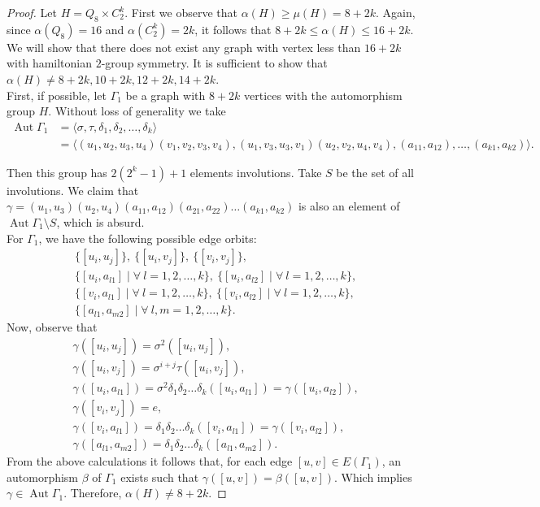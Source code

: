 \documentclass[12pt]{article}
\theoremstyle{plain}
\theoremstyle{definition}
\newcommand{\Aut}{\mathop{\mathrm{Aut}}}
\begin{document}
	\begin{proof}
		Let $H=Q_8\times C_2^k$. First we observe that $\alpha(H)\geq\mu(H)=8+2k$. Again, since $\alpha(Q_8)=16$ and $\alpha(C_2^k)=2k$, it follows that $8 + 2k \leq \alpha(H) \leq 16 + 2k$. We will show that there does not exist any graph with vertex less than $16+2k$ with hamiltonian $2$-group symmetry. It is sufficient to show that $\alpha(H)\neq 8+2k, 10+2k, 12+2k, 14+2k$.\\
		First, if possible, let $\Gamma_{1}$ be a graph with $8+2k$ vertices with the automorphism group $H$. Without loss of generality we take
		\begin{align*}
			\Aut \Gamma_{1} &= \langle \sigma, \tau, \delta_{1}, \delta_{2}, \ldots, \delta_{k} \rangle \\
			&= \langle (u_{1}, u_{2}, u_{3}, u_{4})(v_{1}, v_{2}, v_{3}, v_{4}), (u_{1}, v_{3}, u_{3}, v_{1})(u_{2}, v_{2}, u_{4}, v_{4}), (a_{11}, a_{12}), \ldots, (a_{k1}, a_{k2})\rangle .
		\end{align*}
		
		Then this group has $2(2^{k} -1)+1$ elements involutions. Take $S$ be the set of all involutions. We claim that $\gamma = (u_{1}, u_{3})(u_{2}, u_{4})(a_{11}, a_{12})(a_{21}, a_{22})\ldots(a_{k1}, a_{k2})$ is also an element of $\Aut \Gamma_{1} \setminus S$, which is absurd.\\
		For $\Gamma_1$, we have the following possible edge orbits:
		\begin{align*}
			&\{[u_{i}, u_{j}]\},\ 
			\{[u_{i}, v_{j}]\},\ 
			\{[v_{i}, v_{j}]\},\\
			&\{[u_{i}, a_{l1}]\mid \forall \ l =1,2,\ldots,k\}, \
			\{[u_{i}, a_{l2}]\mid \forall \ l =1,2,\ldots,k\},\\ 
			& \{[v_{i}, a_{l1}]\mid \forall \ l =1,2,\ldots,k\},\	
			\{[v_{i}, a_{l2}]\mid \forall \ l =1,2,\ldots,k\},\\
			& \{[a_{l1}, a_{m2}]\mid \forall \ l,m =1,2,\ldots,k\}.
		\end{align*}	 
		Now, observe that
		\begin{align*}
			&\gamma([u_{i}, u_{j}]) = \sigma^{2}([u_{i}, u_{j}]),\\
			&\gamma([u_{i}, v_{j}]) = \sigma^{i+j}\tau ([u_{i}, v_{j}]),\\
			&\gamma([u_{i}, a_{l1}]) = \sigma^{2} \delta_{1} \delta_{2} \ldots \delta_{k} ([u_{i}, a_{l1}]) = \gamma([u_{i}, a_{l2}]),\\
			&\gamma([v_{i}, v_{j}]) = e,\\
			&\gamma([v_{i}, a_{l1}]) = \delta_{1} \delta_{2} \ldots \delta_{k} ([v_{i}, a_{l1}]) = \gamma([v_{i}, a_{l2}]),\\
			&\gamma([a_{l1}, a_{m2}]) = \delta_{1} \delta_{2} \ldots \delta_{k} ([a_{l1}, a_{m2}]).
		\end{align*}
		From the above calculations it follows that, for each edge $[u,v]\in E(\Gamma_1)$, an automorphism $\beta$ of $\Gamma_1$ exists such that $\gamma([u,v]) = \beta ([u,v])$. Which implies $\gamma\in \Aut \Gamma_1$. Therefore, $\alpha(H)\neq 8+2k$.  
		

\end{proof}
\end{document}
